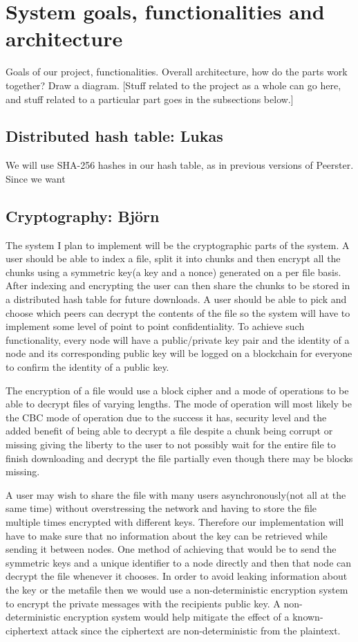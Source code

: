 \documentclass[12pt,a4paper,draft]{article}
\begin{document}
\section{System goals, functionalities and architecture}

Goals of our project, functionalities.
Overall architecture, how do the parts work together?
Draw a diagram.
[Stuff related to the project as a whole can go here, and stuff related to a particular part goes in the subsections below.]

\subsection{Distributed hash table: Lukas}

We will use SHA-256 hashes in our hash table, as in previous versions of Peerster.
Since we want

\subsection{Cryptography: Björn}

The system I plan to implement will be the cryptographic parts of the system. A user should be able to index a file, split it into chunks and then encrypt all the chunks using a symmetric key(a key and a nonce) generated on a per file basis. After indexing and encrypting the user can then share the chunks to be stored in a distributed hash table for future downloads. A user should be able to pick and choose which peers can decrypt the contents of the file so the system will have to implement some level of point to point confidentiality. To achieve such functionality, every node will have a public/private key pair and the identity of a node and its corresponding public key will be logged on a blockchain for everyone to confirm the identity of a public key.

The encryption of  a file would use a block cipher and a mode of operations to be able to decrypt files of varying lengths. The mode of operation will most likely be the CBC mode of operation due to the success it has, security level and the added benefit of being able to decrypt a file despite a chunk being corrupt or missing giving the liberty to the user to not possibly wait for the entire file to finish downloading and decrypt the file partially even though there may be blocks missing.

A user may wish to share the file with many users asynchronously(not all at the same time) without overstressing the network and having to store the file multiple times encrypted with different keys. Therefore our implementation will have to make sure that no information about the key can be retrieved while sending it between nodes. One method of achieving that would be to send the symmetric keys and a unique identifier to a node directly and then that node can decrypt the file whenever it chooses. In order to avoid leaking information about the key or the metafile then we would use a non-deterministic encryption system to encrypt the private messages with the recipients public key. A non-deterministic encryption system would help mitigate the effect of a known-ciphertext attack since the ciphertext are non-deterministic from the plaintext.
\end{document}
